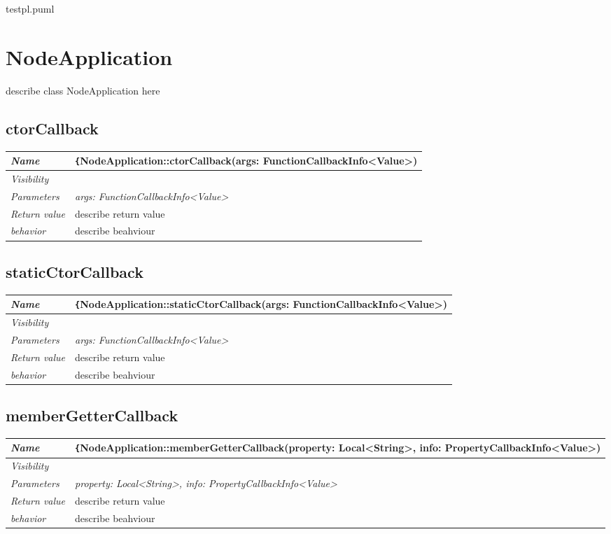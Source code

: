 testpl.puml
\chapter{NodeApplication}
describe class NodeApplication here
\section{ctorCallback}
\begin{longtable}{p{3cm} @{\hskip 1cm} p{12cm}}
 \hline
\textit{Name} & \texttt\{NodeApplication::ctorCallback(args: FunctionCallbackInfo<Value>)}\\
\hline
 \textit{Visibility} & \\
\hline
\textit{Parameters} & \textit{args: FunctionCallbackInfo<Value>}\\
\hline
\textit{Return value} & \textbf{} describe return value\\
  \hline
  \textit{behavior} & describe beahviour \\
  \hline
\end{longtable}
 \pagebreak\n\section{staticCtorCallback}
\begin{longtable}{p{3cm} @{\hskip 1cm} p{12cm}}
 \hline
\textit{Name} & \texttt\{NodeApplication::staticCtorCallback(args: FunctionCallbackInfo<Value>)}\\
\hline
 \textit{Visibility} & \\
\hline
\textit{Parameters} & \textit{args: FunctionCallbackInfo<Value>}\\
\hline
\textit{Return value} & \textbf{} describe return value\\
  \hline
  \textit{behavior} & describe beahviour \\
  \hline
\end{longtable}
 \pagebreak\n\section{memberGetterCallback}
\begin{longtable}{p{3cm} @{\hskip 1cm} p{12cm}}
 \hline
\textit{Name} & \texttt\{NodeApplication::memberGetterCallback(property: Local<String>, info: PropertyCallbackInfo<Value>)}\\
\hline
 \textit{Visibility} & \\
\hline
\textit{Parameters} & \textit{property: Local<String>, info: PropertyCallbackInfo<Value>}\\
\hline
\textit{Return value} & \textbf{} describe return value\\
  \hline
  \textit{behavior} & describe beahviour \\
  \hline
\end{longtable}
